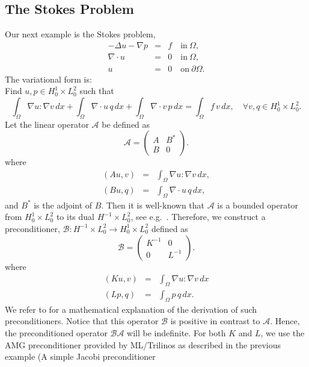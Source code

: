 \subsection{The Stokes Problem}
Our next example is the Stokes problem, 
\begin{eqnarray}
-\Delta u - \nabla p &=& f \quad \mbox{in} \ \Omega, \\ 
\nabla \cdot u &=& 0 \quad \mbox{in} \  \Omega, \\
             u &=& 0   \quad \mbox{on} \  \partial \Omega.  
\end{eqnarray}
The variational form is: \\ 
Find $u,p \in H^1_0 \times L_0^2$ such that  
\[
\int_\Omega \nabla u : \nabla v \,  dx + 
\int_\Omega \nabla \cdot u \, q \,  dx +  
\int_\Omega \nabla \cdot v \, p \,  dx = \int_\Omega f\, v\, dx   , \quad \forall v,q \in H^1_0 \times L_0^2.
\]
Let the linear operator $\mathcal{A}$ be defined as
\[
\mathcal{A}  =
\begin{pmatrix} A & B^* \\ B & 0 \end{pmatrix}.
\]
where 
\begin{eqnarray}
(A u, v) &=& \int_\Omega \nabla u : \nabla v \,  dx, \\  
(B u, q) &=& \int_\Omega \nabla \cdot u \, q \,  dx,    
\end{eqnarray}
and $B^*$ is the adjoint of $B$.  
Then it is well-known that $\mathcal{A}$ is a bounded operator from
$H^1_0 \times L_0^2$ to its dual $H^{-1} \times L_0^2$, see e.g.~\cite{Brezzi,BrezziFortin}. Therefore, we 
construct a preconditioner, 
$\mathcal{B}: H^{-1} \times L_0^2 \rightarrow H^1_0 \times L_0^2$
defined as 
\[
\mathcal{B} 
= 
\begin{pmatrix} K^{-1} & 0 \\ 0 & L^{-1} \end{pmatrix}.
\]
where 
\begin{eqnarray}
(K u, v) &=& \int_\Omega \nabla u: \nabla v \, dx \\ 
(L p, q) &=& \int_\Omega p \, q \, dx .   
\end{eqnarray}
We refer to \cite{M-W-09} for a mathematical explanation of the derivation 
of such preconditioners. 
Notice that this operator $\mathcal{B}$ is  positive in contrast to $\mathcal{A}$. Hence, 
the preconditioned operator $\mathcal{B} \mathcal{A}$ will be indefinite. For both 
$K$ and $L$, we use the AMG preconditioner provided by ML/Trilinos as
described in the previous example (A simple Jacobi preconditioner
